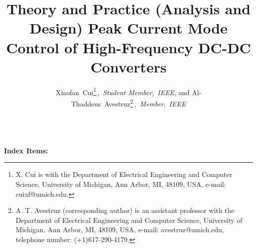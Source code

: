 \documentclass[pdftex,letterpaper,11pt]{article}
\begin{document}
\theoremstyle{definition}
\newtheorem{theorem}{Theorem}

\theoremstyle{definition}
\newtheorem{definition}{Definition}

\theoremstyle{definition}
\newtheorem{corollary}{Corollary}

\theoremstyle{definition}
\newtheorem{proposition}{Proposition}

\title {\large  \bf \vspace{-10ex}
Theory and Practice (Analysis and Design) Peak Current Mode Control of High-Frequency DC-DC Converters
\vspace{0ex}}
\date{}
\author{Xiaofan~Cui\thanks{X. Cui is with the Department
of Electrical Engineering and Computer Science, University of Michigan, Ann Arbor,
MI, 48109, USA, e-mail: cuixf@umich.edu.}\,,\ \textit{Student Member},~\textit{IEEE},
        and Al-Thaddeus~Avestruz\thanks{A. T. Avestruz (corresponding author) is an assistant professor with the Department
        of Electrical Engineering and Computer Science, University of Michigan, Ann Arbor, MI, 48109, USA, e-mail: avestruz@umich.edu, telephone number: (+1)617-290-4179.}\,,\ \textit{Member},~\textit{IEEE}
}
\maketitle
\thispagestyle{empty}
\pagestyle{empty}

\renewcommand{\figurename}{Fig.}


\\
\textbf{Index Items:}
\newpage








{\vspace{\baselineskip}


}
\end{document}
